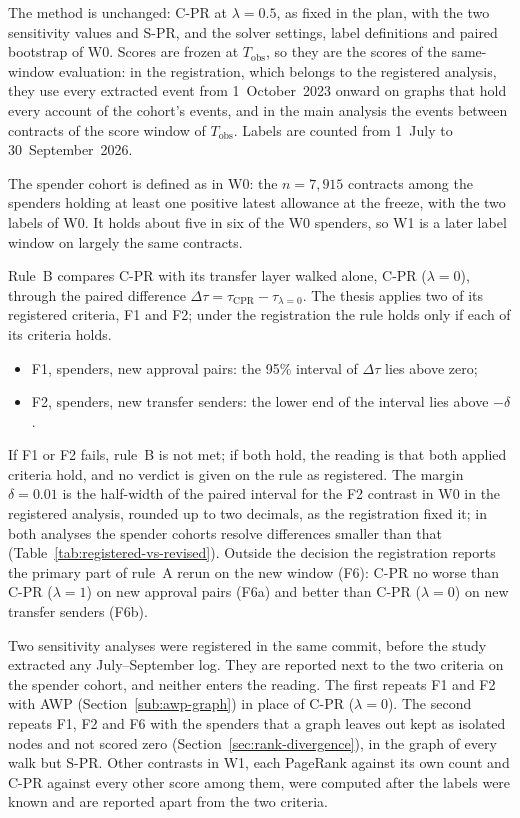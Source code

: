 The method is unchanged: \mbox{C-PR} at $\lambda=0.5$, as fixed in the plan, with the two sensitivity values and \mbox{S-PR}, and the solver settings, label definitions and paired bootstrap of W0. Scores are frozen at $T_{\mathrm{obs}}$, so they are the scores of the same-window evaluation: in the registration, which belongs to the registered analysis, they use every extracted event from 1~October~2023 onward on graphs that hold every account of the cohort's events, and in the main analysis the events between contracts of the score window of $T_{\mathrm{obs}}$. Labels are counted from 1~July to 30~September~2026.

The spender cohort is defined as in W0: the $n=7{,}915$ contracts among the spenders holding at least one positive latest allowance at the freeze, with the two labels of W0. It holds about five in six of the W0 spenders, so W1 is a later label window on largely the same contracts.

Rule~B compares \mbox{C-PR} with its transfer layer walked alone, \mbox{C-PR} ($\lambda=0$), through the paired difference $\Delta\tau=\tau_{\mathrm{CPR}}-\tau_{\lambda=0}$. The thesis applies two of its registered criteria, F1 and F2; under the registration the rule holds only if each of its criteria holds.
\begin{itemize}
\item F1, spenders, new approval pairs: the 95\% interval of $\Delta\tau$ lies above zero;
\item F2, spenders, new transfer senders: the lower end of the interval lies above $-\delta$.
\end{itemize}
If F1 or F2 fails, rule~B is not met; if both hold, the reading is that both applied criteria hold, and no verdict is given on the rule as registered. The margin $\delta=0.01$ is the half-width of the paired interval for the F2 contrast in W0 in the registered analysis, rounded up to two decimals, as the registration fixed it; in both analyses the spender cohorts resolve differences smaller than that (Table~\ref{tab:registered-vs-revised}). Outside the decision the registration reports the primary part of rule~A rerun on the new window (F6): \mbox{C-PR} no worse than \mbox{C-PR} ($\lambda=1$) on new approval pairs (F6a) and better than \mbox{C-PR} ($\lambda=0$) on new transfer senders (F6b).

Two sensitivity analyses were registered in the same commit, before the study extracted any July--September log. They are reported next to the two criteria on the spender cohort, and neither enters the reading. The first repeats F1 and F2 with AWP (Section~\ref{sub:awp-graph}) in place of \mbox{C-PR} ($\lambda=0$). The second repeats F1, F2 and F6 with the spenders that a graph leaves out kept as isolated nodes and not scored zero (Section~\ref{sec:rank-divergence}), in the graph of every walk but \mbox{S-PR}. Other contrasts in W1, each PageRank against its own count and \mbox{C-PR} against every other score among them, were computed after the labels were known and are reported apart from the two criteria.

